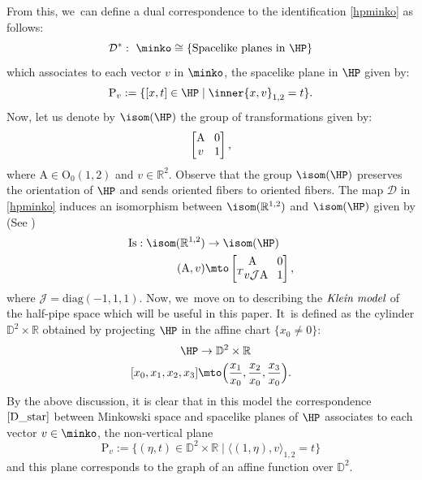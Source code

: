 From this, we~can define a dual correspondence to the identification \eqref{hpminko} as follows:
\begin{equation}\label{D_star}
\mathcal{D}^*: \ \minko\cong\{\text{Spacelike planes in } \HP \}
\end{equation}
which associates to each vector $v$ in $\minko$, the spacelike plane in $\HP$ given by:
\[
\mathrm{P}_v:=\{[x,t]\in\HP \mid \inner{x,v}_{1,2}=t \}.
\]
Now, let us denote by $\isom(\HP)$ the group of transformations given by:
\[\arraycolsep4pt
\begin{bmatrix}
\mathrm{A} & 0 \\
v & 1
\end{bmatrix},
\]
where $\mathrm{A}\in \mathrm{O}_{0}(1,2)$ and $v\in \mathbb{R}^2$. Observe that the group $\isom(\HP)$ preserves the orientation of $\HP$ and sends oriented fibers to oriented fibers. The map $\mathcal{D}$ in \eqref{hpminko} induces an isomorphism between
$\isom(\mathbb{R}^{1,2})$ and $\isom(\HP)$ given by (See \cite[\S 2.8]{riolo_seppi})
\begin{equation}\label{groupeduality}
\begin{aligned}
\mathrm{Is}:\isom(\mathbb{R}^{1,2}) & \to \isom(\HP) \\
(\mathrm{A},v) & \mto\arraycolsep4pt \begin{bmatrix}
\mathrm{A} & 0 \\
^T v\mathcal{J}\mathrm{A} & 1
\end{bmatrix},
\end{aligned}
\end{equation}
where $\mathcal{J}=\mathrm{diag}(-1,1,1)$.
Now, we~move on to describing the $\emph{Klein model}$ of the half-pipe space which will be useful in this paper. It~is defined as the cylinder $\mathbb{D}^2\times\mathbb{R}$ obtained by projecting $\HP$ in the affine chart $\{x_0\neq 0\}$:
\begin{equation}\label{7}
\begin{aligned}
\HP & \to \mathbb{D}^2\times\mathbb{R} \\
[x_0,x_1,x_2,x_3] & \mto \Bigl(\frac{x_1}{x_0},\frac{x_2}{x_0},\frac{x_3}{x_0}\Bigr).
\end{aligned}
\end{equation}
By the above discussion, it is clear that in this model the correspondence $\eqref{D_star}$ between Minkowski space and spacelike planes of $\HP$ associates to each vector $v\in\minko$, the non-vertical plane
\begin{equation}\label{formule_dual_plan}
\mathrm{P}_v:=\{(\eta,t)\in\mathbb{D}^2\times\mathbb{R} \mid \langle (1,\eta),v \rangle_{1,2}=t \}\end{equation} and this plane corresponds to the graph of an affine function over $\mathbb{D}^2$.
